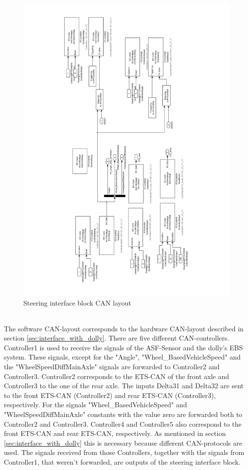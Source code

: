 \documentclass[ExampleMasters.tex]{subfiles}
\begin{document}
 \begin{figure}[h]
 	\centering
 	\includegraphics[width=1\linewidth]{figures/steering_interface_inside}
 	
 	\caption{Steering interface block \gls{CAN} layout}
 	\label{fig:steering_interface_inside_pdf}
 \end{figure} \\
 
 The software CAN-layout corresponds to the hardware CAN-layout described in section \ref{sec:interface_with_dolly}. There are five different CAN-controllers. Controller1 is used to receive the signals of the ASF-Sensor and the dolly's \gls{EBS} system. These signals, except for the "Angle", "Wheel\_BasedVehicleSpeed" and the "WheelSpeedDiffMainAxle" signals are forwarded to Controller2 and Controller3. Controller2 corresponds to the \gls{ETS}-\gls{CAN} of the front axle and Controller3 to the one of the rear axle. The inputs Delta31 and Delta32 are sent to the front \gls{ETS}-\gls{CAN} (Controller2) and rear \gls{ETS}-\gls{CAN} (Controller3), respectively. For the signals "Wheel\_BasedVehicleSpeed" and  "WheelSpeedDiffMainAxle" constants with the value zero are forwarded both to Controller2 and Controller3.
 Controller4 and Controller5 also correspond to the front \gls{ETS}-\gls{CAN} and rear \gls{ETS}-\gls{CAN}, respectively. As mentioned in section \ref{sec:interface_with_dolly} this is necessary because different CAN-protocols are used. The signals received from those Controllers, together with the signals from Controller1, that weren't forwarded, are outputs of the steering interface block.
  
\end{document}
